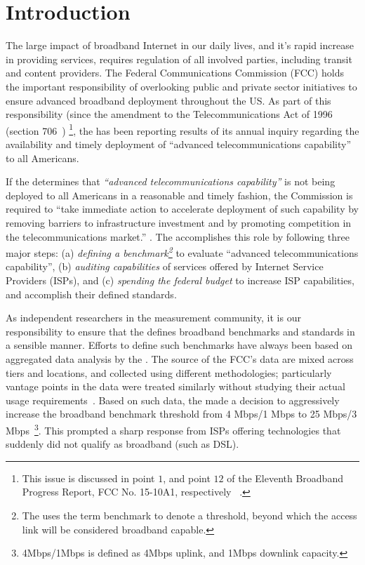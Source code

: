 \section{Introduction}
\label{sec:intro}

The large impact of broadband Internet in our daily lives, and it’s rapid increase in providing
services, requires regulation of all involved parties, including transit and content providers.
The Federal Communications Commission (FCC) holds the important responsibility of overlooking public
and private sector initiatives to ensure advanced broadband deployment throughout the US. As part of
this responsibility (since the amendment to the Telecommunications Act of 1996 (section 706~\cite{fcc1996telecom-act})
\footnote{This issue is discussed in point $1$, and point $12$ of the Eleventh Broadband Progress Report,
FCC No. 15-10A1, respectively ~\cite{fcc2015progress-report}\label{foot:fcc-issues}.}, 
the \FCC has been reporting results of its annual inquiry regarding the
availability and timely deployment of ``advanced telecommunications capability'' to all Americans.


If the \FCC determines that \emph{``advanced telecommunications capability''} is not being deployed
to all Americans in a reasonable and timely fashion, the Commission is required to ``take immediate
action to accelerate deployment of such capability by removing barriers to infrastructure investment
and by promoting competition in the telecommunications market.'' .
The \FCC accomplishes this role by following three major steps:
(a) \emph{defining a benchmark\footnote{The \FCC uses the term benchmark to denote a 
threshold, beyond which the access link will be considered broadband capable.}} 
to evaluate ``advanced telecommunications capability'', (b) \emph{auditing
capabilities} of services offered by Internet Service Providers (ISPs), and (c) \emph{spending the
federal budget} to increase ISP capabilities, and accomplish their defined standards.

As independent researchers in the measurement community, it is our responsibility
to ensure that the
\FCC defines broadband benchmarks and standards in a sensible manner. Efforts to define such
benchmarks have always been based on aggregated data analysis by the \FCC. The 
source of the FCC's data are mixed across tiers and locations, and collected 
using different methodologies; particularly vantage points in the data were 
treated similarly without studying their actual usage 
requirements~\cite{fcc2015progress-report}. Based on such data, the \FCC made a 
decision to aggressively increase the broadband benchmark threshold from 4 
Mbps/1 Mbps to 25 Mbps/3 Mbps~\cite{fcc-redefine-ieee}\footnote{4Mbps/1Mbps is 
defined as 4Mbps uplink, and 1Mbps downlink capacity.}. This prompted a sharp 
response from ISPs offering technologies that suddenly did not qualify as 
broadband (such as DSL).

